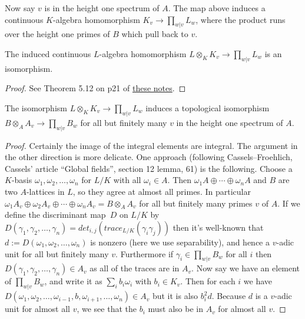Now say $v$ is in the height one spectrum of $A$. The map above induces a continuous
$K$-algebra homomorphism $K_v\to\prod_{w|v}L_w$, where the product runs over the height one
primes of $B$ which pull back to $v$.

\begin{theorem}
  \label{IsDedekindDomain.HeightOneSpectrum.adicCompletionComapAlgEquiv}
  The induced continuous $L$-algebra homomorphism $L\otimes_KK_v\to\prod_{w|v}L_w$ is an isomorphism.
\end{theorem}
\begin{proof}
  See Theorem 5.12 on p21 of \href{https://math.berkeley.edu/~ltomczak/notes/Mich2022/LF_Notes.pdf}
  {these notes}.
\end{proof}

\begin{theorem}
  \label{IsDedekindDomain.HeightOneSpectrum.adicCompletionComapAlgEquiv_integral}
  The isomorphism $L\otimes_KK_v\to\prod_{w|v}L_w$ induces a topological isomorphism
  $B\otimes_AA_v\to \prod_{w|v}B_w$
  for all but finitely many $v$ in the height one spectrum of $A$.
\end{theorem}
\begin{proof}
  Certainly the image of the integral elements are integral. The argument in the other
  direction is more delicate. One approach (following Cassels--Froehlich, Cassels' article
  ``Global fields'', section 12 lemma, 61) is the following. Choose a $K$-basis
  $\omega_1,\omega_2,\ldots,\omega_n$ for $L/K$ with all $\omega_i\in A$.
  Then $\omega_1A\oplus\cdots\oplus\omega_nA$ and
  $B$ are two $A$-lattices in $L$, so they agree at almost all primes. In particular
  $\omega_1A_v\oplus\omega_2A_v\oplus\cdots\oplus\omega_nA_v=B\otimes_AA_v$ for all but
  finitely many primes $v$ of $A$. If we define the discriminant map~$D$ on $L/K$
  by $D(\gamma_1,\gamma_2,\ldots,\gamma_n)=det_{i,j}(trace_{L/K}(\gamma_i\gamma_j))$
  then it's well-known that $d:=D(\omega_1,\omega_2,\ldots,\omega_n)$ is nonzero (here we use
  separability), and hence a $v$-adic unit for all but finitely many $v$. Furthermore if
  $\gamma_i\in \prod_{w|v}B_w$ for all $i$ then $D(\gamma_1,\gamma_2,\ldots,\gamma_n)\in A_v$
  as all of the traces are in $A_v$. Now say
  we have an element of $\prod_{w|v}B_w$, and write it as $\sum_i b_i\omega_i$ with
  $b_i\in K_v$. Then for each $i$ we have
  $D(\omega_1,\omega_2,\ldots,\omega_{i-1},b,\omega_{i+1},\ldots,\omega_n)\in A_v$
  but it is also $b_i^2d$. Because $d$ is a $v$-adic unit for almost all $v$, we
  see that the $b_i$ must also be in $A_v$ for almost all $v$.
\end{proof}

